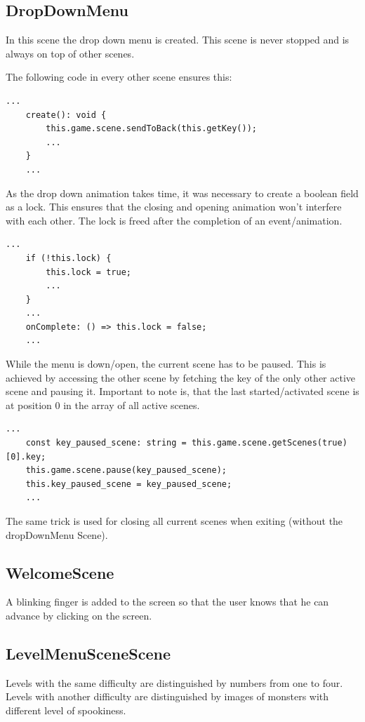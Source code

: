 \subsection{DropDownMenu}\label{subsec:dropdownmenu}
In this scene the drop down menu is created.
This scene is never stopped and is always on top of other scenes.

The following code in every other scene ensures this:
\begin{lstlisting}[style=TypeScript, caption={Send current scene to back}]
    ...
    create(): void {
        this.game.scene.sendToBack(this.getKey());
        ...
    }
    ...
\end{lstlisting}

As the drop down animation takes time, it was necessary to create a boolean field as a lock.
This ensures that the closing and opening animation won't interfere with each other.
The lock is freed after the completion of an event/animation.

\begin{lstlisting}[style=TypeScript, caption={Lock aquiring and freeing}]
    ...
    if (!this.lock) {
        this.lock = true;
        ...
    }
    ...
    onComplete: () => this.lock = false;
    ...
\end{lstlisting}

While the menu is down/open, the current scene has to be paused.
This is achieved by accessing the other scene by fetching the key of the only other active scene and pausing it.
Important to note is, that the last started/activated scene is at position 0 in the array of all active scenes.
\begin{lstlisting}[style=TypeScript, caption={Fetching current active scene}]
    ...
    const key_paused_scene: string = this.game.scene.getScenes(true)[0].key;
    this.game.scene.pause(key_paused_scene);
    this.key_paused_scene = key_paused_scene;
    ...
\end{lstlisting}

The same trick is used for closing all current scenes when exiting (without the dropDownMenu Scene).

\subsection{WelcomeScene}\label{subsec:welcomescene}
A blinking finger is added to the screen so that the user knows that he can advance by clicking on the screen.

\subsection{LevelMenuSceneScene}\label{subsec:levelmenuscenescene}
Levels with the same difficulty are distinguished by numbers from one to four.
Levels with another difficulty are distinguished by images of monsters with different level of spookiness.

